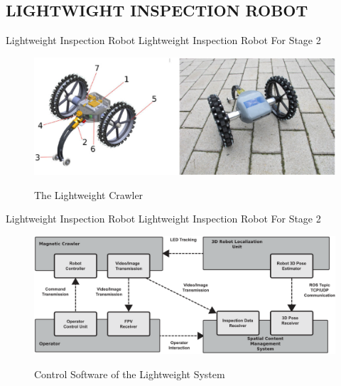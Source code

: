 \documentclass{beamer}
\begin{document}
            \subsection{LIGHTWIGHT INSPECTION ROBOT}
            \begin{frame}{Lightweight Inspection Robot}
                \centering
                Lightweight Inspection Robot For Stage 2
                    \begin{figure}[htb]
                        \centering
                        \includegraphics[scale=0.2]{figuras/lightweight_crawler.png}                   
                        \label{}
                        \caption{The Lightweight Crawler}
                    \end{figure}                 
            \end{frame} 

            \begin{frame}{Lightweight Inspection Robot}
                \centering
                Lightweight Inspection Robot For Stage 2 
                    \begin{figure}[htb]
                        \centering
                        \includegraphics[scale=0.15]{figuras/overview_of_the_control_software_of_the_lightweight_system.png}                   
                        \label{}
                        \caption{Control Software of the Lightweight System}
                    \end{figure} 
            \end{frame}        
            
\end{document}
